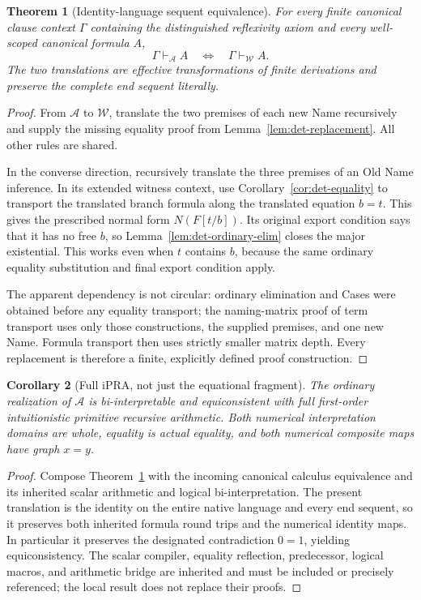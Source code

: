 \documentclass[11pt,a4paper]{article}
\newtheorem{theorem}{Theorem}[section]
\newtheorem{corollary}[theorem]{Corollary}
\theoremstyle{definition}\newtheorem{definition}[theorem]{Definition}
\theoremstyle{remark}\newtheorem{remark}[theorem]{Remark}
\begin{document}
\begin{theorem}[Identity-language sequent equivalence]
\label{thm:det-equivalence}
For every finite canonical clause context $\Gamma$ containing the
distinguished reflexivity axiom and every well-scoped canonical formula
$A$,
\[
               \Gamma\vdash_{\mathcal A} A
          \quad\Longleftrightarrow\quad
               \Gamma\vdash_{\mathcal W} A.
\]
The two translations are effective transformations of finite derivations
and preserve the complete end sequent literally.
\end{theorem}
\begin{proof}
From $\mathcal A$ to $\mathcal W$, translate the two premises of each
new Name recursively and supply the missing equality proof from
Lemma~\ref{lem:det-replacement}. All other rules are shared.

In the converse direction, recursively translate the three premises of
an Old Name inference. In its extended witness context, use
Corollary~\ref{cor:det-equality} to transport the translated branch
formula along the translated equation $b=t$. This gives the prescribed
normal form $N(F[t/b])$. Its original export condition says that it has
no free $b$, so Lemma~\ref{lem:det-ordinary-elim} closes the major
existential. This works even when $t$ contains $b$, because the same
ordinary equality substitution and final export condition apply.

The apparent dependency is not circular: ordinary elimination and
Cases were obtained before any equality transport; the naming-matrix
proof of term transport uses only those constructions, the supplied
premises, and one new Name. Formula transport then uses strictly
smaller matrix depth. Every replacement is therefore a finite, explicitly
defined proof construction.
\end{proof}

\begin{corollary}[Full iPRA, not just the equational fragment]
The ordinary realization of $\mathcal A$ is bi-interpretable and
equiconsistent with full first-order intuitionistic primitive recursive
arithmetic. Both numerical interpretation domains are whole, equality
is actual equality, and both numerical composite maps have graph $x=y$.
\end{corollary}
\begin{proof}
Compose Theorem~\ref{thm:det-equivalence} with the incoming canonical
calculus equivalence and its inherited scalar arithmetic and logical
bi-interpretation. The present translation is the identity on the entire
native language and every end sequent, so it preserves both inherited
formula round trips and the numerical identity maps. In particular it
preserves the designated contradiction $0=1$, yielding equiconsistency.
The scalar compiler, equality reflection, predecessor, logical macros,
and arithmetic bridge are inherited and must be included or precisely
referenced; the local result does not replace their proofs.
\end{proof}
\end{document}
